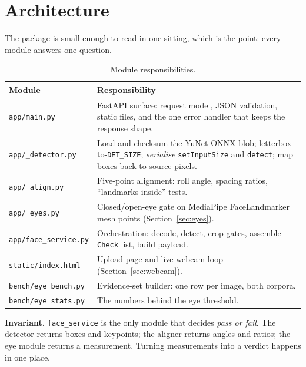 \documentclass[11pt,a4paper]{article}
\newcommand{\coden}[1]{\texttt{\small #1}}
\begin{document}
\section{Architecture}

The package is small enough to read in one sitting, which is the point:
every module answers one question.

\begin{table}[H]
\centering
\caption{Module responsibilities.}
\label{tab:modules}
\renewcommand{\arraystretch}{1.25}
\begin{tabularx}{\linewidth}{@{}l X@{}}
\toprule
\textbf{Module} & \textbf{Responsibility} \\
\midrule
\coden{app/main.py}         & FastAPI surface: request model, JSON validation, static files, and the one error handler that keeps the response shape. \\
\coden{app/\_detector.py}   & Load and checksum the YuNet ONNX blob; letterbox-to-\coden{DET\_SIZE}; \emph{serialise} \coden{setInputSize} and \coden{detect}; map boxes back to source pixels. \\
\coden{app/\_align.py}      & Five-point alignment: roll angle, spacing ratios, ``landmarks inside'' tests. \\
\coden{app/\_eyes.py}       & Closed/open-eye gate on MediaPipe FaceLandmarker mesh points (Section~\ref{sec:eyes}). \\
\coden{app/face\_service.py}& Orchestration: decode, detect, crop gates, assemble \coden{Check} list, build payload. \\
\coden{static/index.html}   & Upload page and live webcam loop (Section~\ref{sec:webcam}). \\
\coden{bench/eye\_bench.py} & Evidence-set builder: one row per image, both corpora. \\
\coden{bench/eye\_stats.py} & The numbers behind the eye threshold. \\
\bottomrule
\end{tabularx}
\end{table}

\begin{keybox}
\textbf{Invariant.} \coden{face\_service} is the only module that
decides \emph{pass or fail}. The detector returns boxes and keypoints;
the aligner returns angles and ratios; the eye module returns a
measurement. Turning measurements into a verdict happens in one place.
\end{keybox}
\end{document}
